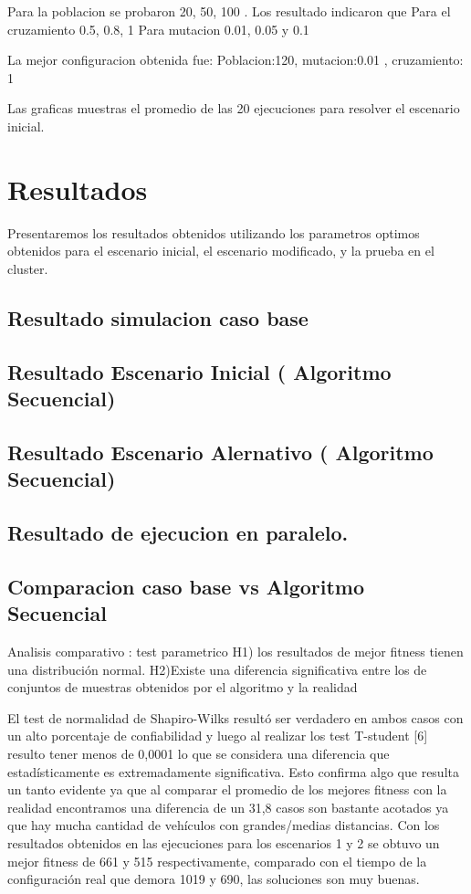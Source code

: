 Para la poblacion se probaron 20, 50, 100 . Los resultado indicaron que 
Para el cruzamiento 0.5, 0.8, 1
Para mutacion 0.01, 0.05 y 0.1

La mejor  configuracion obtenida fue:
Poblacion:120, mutacion:0.01 , cruzamiento: 1

Las graficas muestras el promedio de las 20 ejecuciones para resolver el escenario inicial.


\section{Resultados}
Presentaremos los resultados obtenidos  utilizando los parametros optimos obtenidos para el escenario inicial, el escenario modificado, y la prueba en el cluster.

\subsection{Resultado simulacion caso base}
\subsection{Resultado Escenario Inicial ( Algoritmo  Secuencial)}
\subsection{Resultado Escenario Alernativo ( Algoritmo  Secuencial)}
\subsection{Resultado de ejecucion en paralelo. }

\subsection{Comparacion caso base vs Algoritmo Secuencial}
Analisis comparativo : test parametrico
H1)  los  resultados  de  mejor  fitness  tienen  una
distribución normal.
H2)Existe  una  diferencia  significativa  entre  los  de
conjuntos  de  muestras  obtenidos  por  el  algoritmo  y  la
realidad

El  test  de  normalidad  de  Shapiro-Wilks  resultó  ser
verdadero  en  ambos  casos  con  un  alto  porcentaje  de
confiabilidad y luego al realizar los test T-student [6] resulto
tener menos de 0,0001 lo que se considera una diferencia que
estadísticamente  es  extremadamente  significativa.  Esto
confirma algo que resulta un tanto evidente ya que al comparar
el promedio de los mejores fitness con la realidad encontramos
una diferencia de un 31,8%
casos  son  bastante  acotados  ya  que  hay  mucha  cantidad  de
vehículos con grandes/medias distancias.
Con  los  resultados  obtenidos  en  las  ejecuciones  para  los
escenarios  1  y  2  se  obtuvo  un  mejor  fitness  de  661  y  515
respectivamente, comparado con el tiempo de la configuración
real que demora 1019 y 690, las soluciones son muy buenas.



